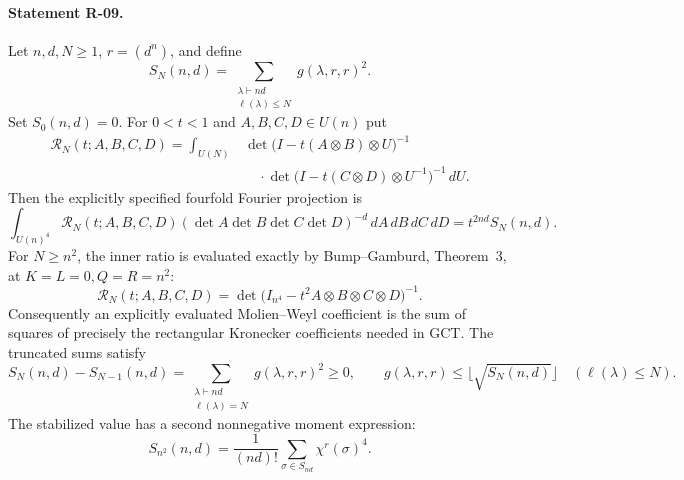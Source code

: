 \paragraph{Statement R-09.}
Let $n,d,N\geq1$, $r=(d^n)$, and define
\[
 S_N(n,d)=\sum_{\substack{\lambda\vdash nd\\\ell(\lambda)\leq N}}
                    g(\lambda,r,r)^2.
\]
Set $S_0(n,d)=0$.
For $0<t<1$ and $A,B,C,D\in U(n)$ put
\begin{align*}
 \mathcal R_N(t;A,B,C,D)=\int_{U(N)}
 &\det\bigl(I-t(A\otimes B)\otimes U\bigr)^{-1}\\[-2mm]
 &\quad\cdot
 \det\bigl(I-t(C\otimes D)\otimes U^{-1}\bigr)^{-1}\,dU.
\end{align*}
Then the explicitly specified fourfold Fourier projection is
\begin{equation}\label{R09:squares}
 \int_{U(n)^4}\mathcal R_N(t;A,B,C,D)
   (\det A\det B\det C\det D)^{-d}\,dA\,dB\,dC\,dD
       =t^{2nd}S_N(n,d).
\end{equation}
For $N\geq n^2$, the inner ratio is evaluated exactly by
Bump--Gamburd, Theorem~3, at $K=L=0,Q=R=n^2$:
\begin{equation}\label{R09:evaluated}
 \mathcal R_N(t;A,B,C,D)
       =\det\bigl(I_{n^4}-t^2 A\otimes B\otimes C\otimes D\bigr)^{-1}.
\end{equation}
Consequently an explicitly evaluated Molien--Weyl coefficient is the
sum of squares of precisely the rectangular Kronecker coefficients
needed in GCT. The truncated sums satisfy
\begin{equation}\label{R09:monotone}
 S_N(n,d)-S_{N-1}(n,d)
    =\sum_{\substack{\lambda\vdash nd\\\ell(\lambda)=N}}g(\lambda,r,r)^2
    \geq0,
 \qquad
 g(\lambda,r,r)\leq\lfloor\sqrt{S_N(n,d)}\rfloor
 \quad(\ell(\lambda)\leq N).
\end{equation}
The stabilized value has a second nonnegative moment expression:
\begin{equation}\label{R09:finitefourth}
 S_{n^2}(n,d)=\frac1{(nd)!}\sum_{\sigma\in S_{nd}}\chi^r(\sigma)^4.
\end{equation}

